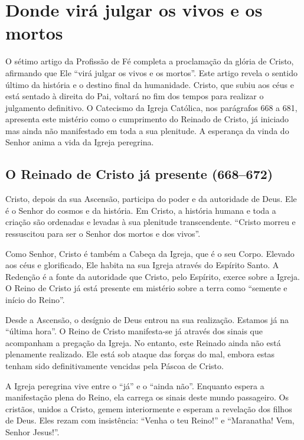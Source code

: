 \chapter{Donde virá julgar os vivos e os mortos}

O sétimo artigo da Profissão de Fé completa a proclamação da glória de Cristo, afirmando que Ele ``virá julgar os vivos e os mortos''. Este artigo revela o sentido último da história e o destino final da humanidade. Cristo, que subiu aos céus e está sentado à direita do Pai, voltará no fim dos tempos para realizar o julgamento definitivo. O Catecismo da Igreja Católica, nos parágrafos 668 a 681, apresenta este mistério como o cumprimento do Reinado de Cristo, já iniciado mas ainda não manifestado em toda a sua plenitude. A esperança da vinda do Senhor anima a vida da Igreja peregrina.

\section{O Reinado de Cristo já presente (668--672)}

Cristo, depois da sua Ascensão, participa do poder e da autoridade de Deus. Ele é o Senhor do cosmos e da história. Em Cristo, a história humana e toda a criação são ordenadas e levadas à sua plenitude transcendente. ``Cristo morreu e ressuscitou para ser o Senhor dos mortos e dos vivos''. 

Como Senhor, Cristo é também a Cabeça da Igreja, que é o seu Corpo. Elevado aos céus e glorificado, Ele habita na sua Igreja através do Espírito Santo. A Redenção é a fonte da autoridade que Cristo, pelo Espírito, exerce sobre a Igreja. O Reino de Cristo já está presente em mistério sobre a terra como ``semente e início do Reino''.

Desde a Ascensão, o desígnio de Deus entrou na sua realização. Estamos já na ``última hora''. O Reino de Cristo manifesta-se já através dos sinais que acompanham a pregação da Igreja. No entanto, este Reinado ainda não está plenamente realizado. Ele está sob ataque das forças do mal, embora estas tenham sido definitivamente vencidas pela Páscoa de Cristo.

A Igreja peregrina vive entre o ``já'' e o ``ainda não''. Enquanto espera a manifestação plena do Reino, ela carrega os sinais deste mundo passageiro. Os cristãos, unidos a Cristo, gemem interiormente e esperam a revelação dos filhos de Deus. Eles rezam com insistência: ``Venha o teu Reino!'' e ``Maranatha! Vem, Senhor Jesus!''.

